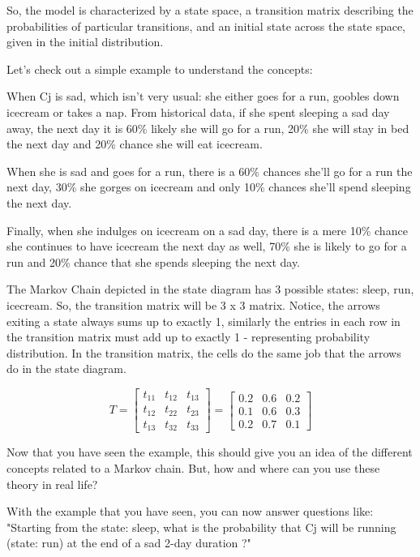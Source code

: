 So, the model is characterized by a state space, a transition matrix describing the probabilities of particular transitions, and an initial state across the state space, given in the initial distribution.

Let's check out a simple example to understand the concepts:


When Cj is sad, which isn't very usual: she either goes for a run, goobles down icecream or takes a nap.
From historical data, if she spent sleeping a sad day away, the next day it is 60\% likely she will go for a run, 20\% she will stay in bed the next day and 20\% chance she will eat icecream.

When she is sad and goes for a run, there is a 60\% chances she'll go for a run the next day, 30\% she gorges on icecream and only 10\% chances she'll spend sleeping the next day.

Finally, when she indulges on icecream on a sad day, there is a mere 10\% chance she continues to have icecream the next day as well, 70\% she is likely to go for a run and 20\% chance that she spends sleeping the next day.


The Markov Chain depicted in the state diagram has 3 possible states: sleep, run, icecream. So, the transition matrix will be 3 x 3 matrix. Notice, the arrows exiting a state always sums up to exactly 1, similarly the entries in each row in the transition matrix must add up to exactly 1 - representing probability distribution. In the transition matrix, the cells do the same job that the arrows do in the state diagram.

\[T = 
\begin{bmatrix}
t_{11} & t_{12} & t_{13} \\
t_{12} & t_{22} & t_{23} \\
t_{13} & t_{32} & t_{33}
\end{bmatrix} =
\begin{bmatrix}
0.2 & 0.6 & 0.2 \\
0.1 & 0.6 & 0.3 \\
0.2 & 0.7 & 0.1
\end{bmatrix} 
\]

Now that you have seen the example, this should give you an idea of the different concepts related to a Markov chain. But, how and where can you use these theory in real life?

With the example that you have seen, you can now answer questions like: "Starting from the state: sleep, what is the probability that Cj will be running (state: run) at the end of a sad 2-day duration ?"

